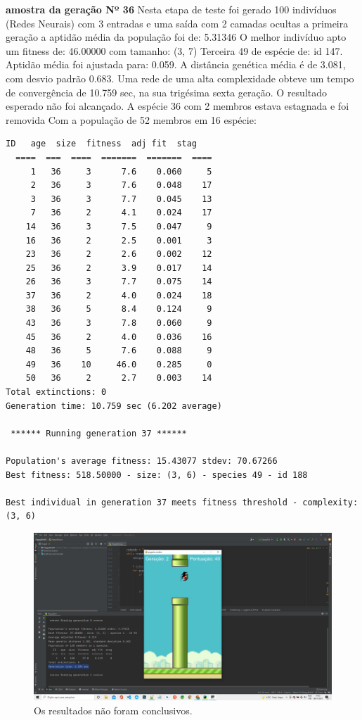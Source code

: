 \textbf{amostra da geração Nº 36
}
Nesta etapa de teste foi gerado 100 indivíduos (Redes Neurais)
com 3 entradas e uma saída com 2 camadas ocultas
a primeira geração a aptidão média da população foi de: 5.31346 
O melhor indivíduo  apto um fitness de: 46.00000 com tamanho: (3, 7)
Terceira 49 de espécie de: id 147.
Aptidão média foi ajustada para: 0.059.
A distância genética média é de 3.081, com desvio padrão 0.683.
Uma rede de uma alta complexidade obteve um tempo de convergência de 10.759 sec, na sua trigésima sexta geração.
O resultado esperado não foi alcançado. 
A espécie 36 com 2 membros estava estagnada e foi removida
Com a população de 52 membros em 16 espécie:

\begin{lstlisting}
ID   age  size  fitness  adj fit  stag
  ====  ===  ====  =======  =======  ====
     1   36     3      7.6    0.060     5
     2   36     3      7.6    0.048    17
     3   36     3      7.7    0.045    13
     7   36     2      4.1    0.024    17
    14   36     3      7.5    0.047     9
    16   36     2      2.5    0.001     3
    23   36     2      2.6    0.002    12
    25   36     2      3.9    0.017    14
    26   36     3      7.7    0.075    14
    37   36     2      4.0    0.024    18
    38   36     5      8.4    0.124     9
    43   36     3      7.8    0.060     9
    45   36     2      4.0    0.036    16
    48   36     5      7.6    0.088     9
    49   36    10     46.0    0.285     0
    50   36     2      2.7    0.003    14
Total extinctions: 0
Generation time: 10.759 sec (6.202 average)

 ****** Running generation 37 ****** 

Population's average fitness: 15.43077 stdev: 70.67266
Best fitness: 518.50000 - size: (3, 6) - species 49 - id 188

Best individual in generation 37 meets fitness threshold - complexity: (3, 6)
\end{lstlisting}

%
\begin{figure}[htpb!]
    \centering 
    \includegraphics[width=0.85\linewidth]{images/2g_pt121.png}
    \caption{Os resultados não foram conclusivos.}
    \label{fig:loss}
\end{figure}
%



